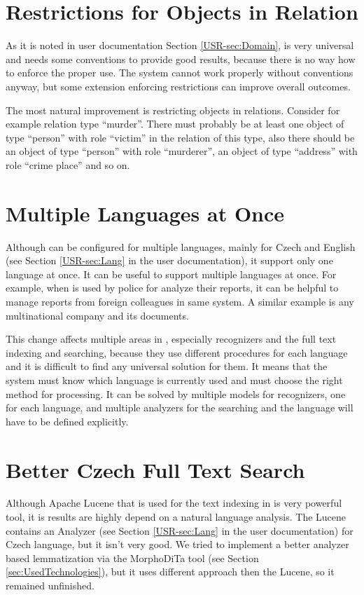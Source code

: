 \section{Restrictions for Objects in Relation}
As it is noted in user documentation Section \ref{USR-sec:Domain},
\textan{} is very universal and needs some conventions to provide good results,
because there is no way how to enforce the proper use. The system cannot work
properly without conventions anyway, but some extension enforcing restrictions
can improve overall outcomes.

The most natural improvement is restricting objects in relations. Consider for
example relation type ``murder''. There must probably be at least one object of
type ``person'' with role ``victim'' in the relation of this type, also there
should be an object of type ``person'' with role ``murderer'', an object of type
``address'' with role ``crime place'' and so on.

\section{Multiple Languages at Once}
Although \textan{} can be configured for multiple languages, mainly for Czech
and English (see Section \ref{USR-sec:Lang} in the user documentation), it
support only one language at once. It can be useful to support multiple
languages at once. For example, when \textan{} is used by police for analyze
their reports, it can be helpful to manage reports from foreign colleagues in
same system. A similar example is any multinational company and its documents.

This change affects multiple areas in \textan{}, especially recognizers and
the full text indexing and searching, because they use different procedures for
each language and it is difficult to find any universal solution for them. It
means that the system must know which language is currently used and must choose
the right method for processing. It can be solved by multiple models for
recognizers, one for each language, and multiple analyzers for the searching and
the language will have to be defined explicitly.

\section{Better Czech Full Text Search}

Although Apache Lucene that is used for the text indexing in \textan is very
powerful tool, it is results are highly depend on a natural language analysis.
The Lucene contains an Analyzer (see Section \ref{USR-sec:Lang} in the user documentation)
for Czech language, but it isn't very good. We tried to implement a better analyzer
based lemmatization via the MorphoDiTa tool (see Section \ref{sec:UsedTechnologies}),
but it uses different approach then the Lucene, so it remained unfinished.

